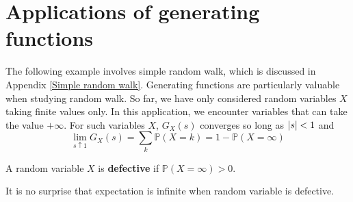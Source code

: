 \documentclass{huhtakm-template-book}
\newcommand{\prob}{\mathbb{P}}
\begin{document}
\section{Applications of generating functions}
The following example involves simple random walk, which is discussed in Appendix \ref{Simple random walk}. Generating functions are particularly valuable when studying random walk. So far, we have only considered random variables $X$ taking finite values only. In this application, we encounter variables that can take the value $+\infty$. For such variables $X$, $G_{X}(s)$ converges so long as $\left|{s}\right|<1$ and
\begin{equation*}
	\lim_{s\uparrow 1}G_{X}(s)=\sum_{k}\prob(X=k)=1-\prob(X=\infty)
\end{equation*}
\begin{defn}
	A random variable $X$ is \textbf{defective} if $\prob(X=\infty)>0$.
\end{defn}
\begin{rem}
	It is no surprise that expectation is infinite when random variable is defective.
\end{rem}
\end{document}

